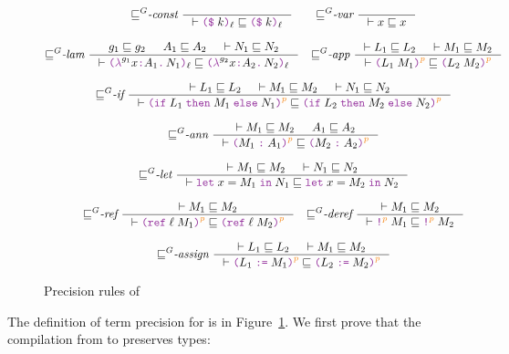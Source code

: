 \begin{figure}[tbp]
  \raggedright
  {\small
  \begin{gather*}
    {\sqsubseteq}^G\textit{-const}~
    \inference{}{\vdash \const{k}{\ell} \sqsubseteq \const{k}{\ell}}
    \qquad
    {\sqsubseteq}^G\textit{-var}~
    \inference{}{\vdash x \sqsubseteq x}
    \\[2ex]
    {\sqsubseteq}^G\textit{-lam}~
    \inference{g_1 \sqsubseteq g_2 & A_1 \sqsubseteq A_2 & \vdash N_1 \sqsubseteq N_2 }
              {\vdash \lam{g_1}{x}{A_1}{N_1}{\ell} \sqsubseteq \lam{g_2}{x}{A_2}{N_2}{\ell}}
    \quad
    {\sqsubseteq}^G\textit{-app}~
    \inference{\vdash L_1 \sqsubseteq L_2 & \vdash M_1 \sqsubseteq M_2}
              {\vdash \app{L_1}{M_1}{p} \sqsubseteq \app{L_2}{M_2}{p}}
    \\[2ex]
    {\sqsubseteq}^G\textit{-if}~
    \inference{\vdash L_1 \sqsubseteq L_2 & \vdash M_1 \sqsubseteq M_2 & \vdash N_1 \sqsubseteq N_2}
              {\vdash \ifexp{L_1}{M_1}{N_1}{p} \sqsubseteq \ifexp{L_2}{M_2}{N_2}{p}}
    \\[2ex]
    {\sqsubseteq}^G\textit{-ann}~
    \inference{\vdash M_1 \sqsubseteq M_2 & A_1 \sqsubseteq A_2}
              {\vdash \ann{M_1}{A_1}{p} \sqsubseteq \ann{M_2}{A_2}{p}}
    \\[2ex]
    {\sqsubseteq}^G\textit{-let}~
    \inference{\vdash M_1 \sqsubseteq M_2 & \vdash N_1 \sqsubseteq N_2}
              {\vdash \letexp{x}{M_1}{N_1} \sqsubseteq \letexp{x}{M_2}{N_2}}
    \\[2ex]
    {\sqsubseteq}^G\textit{-ref}~
    \inference{\vdash M_1 \sqsubseteq M_2}
              {\vdash \refexp{\ell}{M_1}{p} \sqsubseteq \refexp{\ell}{M_2}{p}}
    \quad
    {\sqsubseteq}^G\textit{-deref}~
    \inference{\vdash M_1 \sqsubseteq M_2}
              {\vdash \deref{M_1}{p} \sqsubseteq \deref{M_2}{p}}
    \\[2ex]
    {\sqsubseteq}^G\textit{-assign}~
    \inference{\vdash L_1 \sqsubseteq L_2 & \vdash M_1 \sqsubseteq M_2}
              {\vdash \assign{L_1}{M_1}{p} \sqsubseteq \assign{L_2}{M_2}{p}}
  \end{gather*}}
  \caption{Precision rules of \Surface}
  \label{fig:surface-precision}
\end{figure}

The definition of term precision for \Surface is in
Figure~\ref{fig:surface-precision}. We first prove that the compilation from
\Surface to \CC preserves types:

